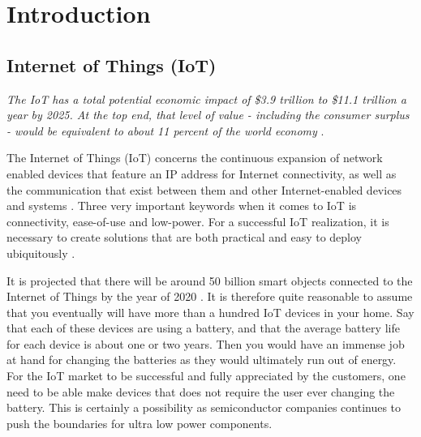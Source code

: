 \chapter{Introduction}

\section{Internet of Things (IoT)}

\textit{The IoT has a total potential economic impact of \$3.9 trillion to \$11.1 trillion a year by 2025. At the top end, that level of value - including the consumer surplus - would be equivalent to about 11 percent of the world economy} \cite{mckinsey15}.





The Internet of Things (IoT) concerns the continuous expansion of network enabled devices that feature an IP address for Internet connectivity, as well as the communication that exist between them and other Internet-enabled devices and systems \cite{webopedia}. Three very important keywords when it comes to IoT is connectivity, ease-of-use and low-power. For a successful IoT realization, it is necessary to create solutions that are both practical and easy to deploy ubiquitously \cite{embedded_IoT}. %


It is projected that there will be around 50 billion smart objects connected to the Internet of Things by the year of 2020 \cite{jayakumar14}. It is therefore quite reasonable to assume that you eventually will have more than a hundred IoT devices in your home. Say that each of these devices are using a battery, and that the average battery life for each device is about one or two years. Then you would have an immense job at hand for changing the batteries as they would ultimately run out of energy. For the IoT market to be successful and fully appreciated by the customers, one need to be able make devices that does not require the user ever changing the battery. This is certainly a possibility as semiconductor companies continues to push the boundaries for ultra low power components.  

